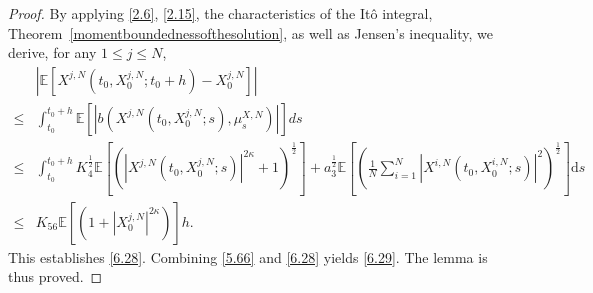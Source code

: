 \documentclass[12pt]{article}
\numberwithin{equation}{section}
\begin{document}
\begin{proof}
By applying \eqref{2.6}, \eqref{2.15}, the characteristics of the It\^o integral, Theorem~\ref{momentboundednessofthesolution}, as well as Jensen's inequality, we derive, for any $1 \leq j \leq N$,
\begin{equation}\tag{5.130}\label{6.30}
\begin{aligned}
&\left| \mathbb{E} \left[ X^{j,N}\left( t_0,X^{j,N}_0;t_0+h \right) -X^{j,N}_0 \right] \right|
\\
\le& \int_{t_0}^{t_0+h}{\mathbb{E} \left[ \left| b\left( X^{j,N}\left( t_0,X^{j,N}_0;s \right) ,\mu _{s}^{X,N} \right) \right| \right]}ds
\\
\le& \int_{t_0}^{t_0+h}K_4^{\frac{1}{2}}\mathbb{E} \left[ \left( \left|X^{j,N}\left( t_0,X^{j,N}_0;s \right) \right|^{2\kappa}+1 \right) ^{\frac{1}{2}} \right]+a_3^{\frac{1}{2}}\mathbb{E} \left[ \left( \tfrac{1}{N}\sum_{i=1}^N{\left|X^{i,N}\left( t_0,X^{i,N}_0;s \right) \right|^2} \right) ^{\frac{1}{2}} \right]\mathrm{d}s
\\
\le& K_{56}\mathbb{E} \left[ \left(1+\left|X^{j,N}_0\right|^{2\kappa}\right) \right] h.
\end{aligned}
\end{equation}
This establishes \eqref{6.28}. 
Combining \eqref{5.66} and \eqref{6.28} yields \eqref{6.29}. 
The lemma is thus proved.
\end{proof}
\end{document}
